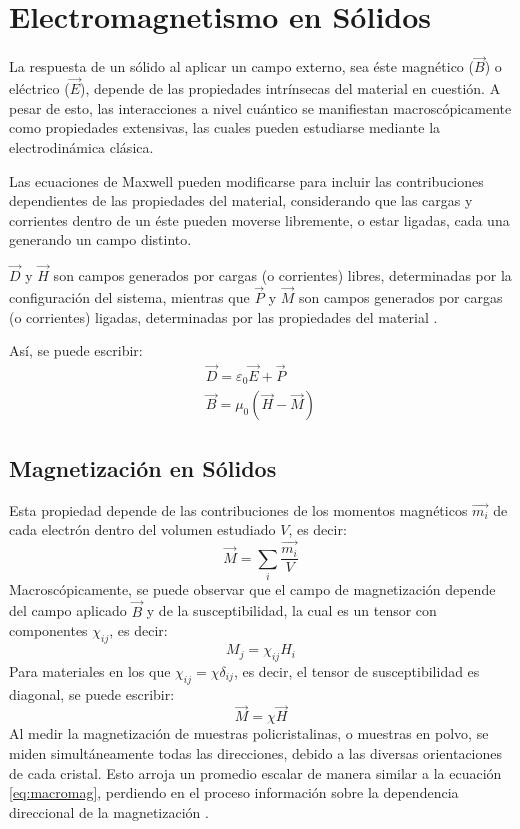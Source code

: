 \documentclass[../main.tex]{subfiles}
\begin{document}
\section{Electromagnetismo en Sólidos}
La respuesta de un sólido al aplicar un campo externo, sea éste magnético ($\vec{B}$) o eléctrico ($\vec{E}$), depende de las propiedades intrínsecas del material en cuestión. A pesar de esto, las interacciones a nivel cuántico se manifiestan macroscópicamente como propiedades extensivas, las cuales pueden estudiarse mediante la electrodinámica clásica.

Las ecuaciones de Maxwell pueden modificarse para incluir las contribuciones dependientes de las propiedades del material, considerando que las cargas y corrientes dentro de un éste pueden moverse libremente, o estar ligadas, cada una generando un campo distinto.

$\vec{D}$ y $\vec{H}$ son campos generados por cargas (o corrientes) libres, determinadas por la configuración del sistema, mientras que $\vec{P}$ y $\vec{M}$ son campos generados por cargas (o corrientes) ligadas, determinadas por las propiedades del material \cite{griffiths2023introduction}.

Así, se puede escribir:
\begin{equation}
    \begin{split}
        \vec{D}=\varepsilon_0\vec{E}+\vec{P}\\
        \vec{B}=\mu_0(\vec{H}-\vec{M})
    \end{split}  
    \label{eq:maxwellmacro}
\end{equation}

\subsection{Magnetización en Sólidos}
Esta propiedad depende de las contribuciones de los momentos magnéticos $\vec{m_i}$ de cada electrón dentro del volumen estudiado $V$, es decir:
\begin{equation}
    \vec{M}=\sum_i\dfrac{\vec{m_i}}{V}
    \label{eq:micromag}
\end{equation}
Macroscópicamente, se puede observar que el campo de magnetización depende del campo aplicado $\vec{B}$ y de la susceptibilidad, la cual es un tensor con componentes $\chi_{ij}$, es decir:
\begin{equation}
    M_j=\chi_{ij}H_i
    \label{eq:tensormag}
\end{equation}
Para materiales en los que $\chi_{ij}=\chi\delta_{ij}$, es decir, el tensor de susceptibilidad es diagonal, se puede escribir:
\begin{equation}
    \vec{M}=\chi\vec{H}
    \label{eq:macromag}
\end{equation}
Al medir la magnetización de muestras policristalinas, o muestras en polvo, se miden simultáneamente todas las direcciones, debido a las diversas orientaciones de cada cristal. Esto arroja un promedio escalar de manera similar a la ecuación \ref{eq:macromag}, perdiendo en el proceso información sobre la dependencia direccional de la magnetización \cite{Mugiraneza2022}.
\end{document}
